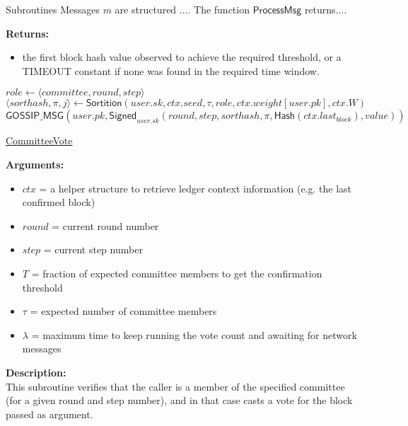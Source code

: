 \documentclass[10pt,a4paper]{article}
\begin{document}
\begin{section}{Subroutines}
Messages $m$ are structured ....
The function $\mathsf{ProcessMsg}$ returns....

\noindent \textbf{Returns:}
\begin{itemize}
    \item the first block hash value observed to achieve the required threshold, 
    or a TIMEOUT constant if none was found in the required time window.
  \end{itemize}


\begin{algorithm}[H]
    \begin{algorithmic}[H]
        \State $role \gets \langle {committee},round,step\rangle$
        \State $\langle sorthash,\pi,j\rangle \gets \mathsf{Sortition}(user.sk,ctx.seed,\tau ,role,ctx.weight[user.pk],ctx.W)$
            \State $\mathsf{GOSSIP\_MSG}(user.pk, \mathsf{Signed}_{user.sk} (round,step,sorthash,\pi,\mathsf{Hash}(ctx.last_{block}),value))$
        \EndIf
    \EndFunction
    \end{algorithmic}
    \caption{\underline{CommitteeVote}}
\end{algorithm}

\noindent \textbf{Arguments:}
\begin{itemize}
    \item $ctx$ = a helper structure to retrieve ledger context information (e.g. the last confirmed block)
    \item $round$ = current round number
    \item $step$ = current step number
    \item $T$ = fraction of expected committee members to get the confirmation threshold
    \item $\tau$ = expected number of committee members
    \item $\lambda$ = maximum time to keep running the vote count and awaiting for network messages
  \end{itemize}

\noindent \textbf{Description:}\\
This subroutine verifies that the caller is a member of the specified committee (for a given round and step number), 
and in that case casts a vote for the block passed as argument.\\


\end{section}
\end{document}
